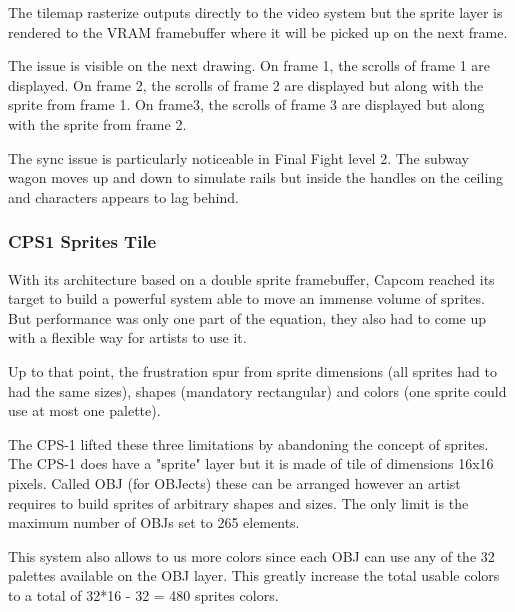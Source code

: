 The tilemap rasterize outputs directly to the video system but the sprite layer is rendered to the VRAM framebuffer where it will be picked up on the next frame.
 


The issue is visible on the next drawing. On frame 1, the scrolls of frame 1 are displayed. On frame 2, the scrolls of frame 2 are displayed but along with the sprite from frame 1. On frame3, the scrolls of frame 3 are displayed but along with the sprite from frame 2. 


\begin{trivia}
The sync issue is particularly noticeable in Final Fight level 2. The subway wagon moves up and down to simulate rails but inside the handles on the ceiling and characters appears to lag behind.
\end{trivia}

\subsubsection{CPS1 Sprites Tile}
With its architecture based on a double sprite framebuffer, Capcom reached its target to build a powerful system able to move an immense volume of sprites. But performance was only one part of the equation, they also had to come up with a flexible way for artists to use it.

Up to that point, the frustration spur from sprite dimensions (all sprites had to had the same sizes), shapes (mandatory rectangular) and colors (one sprite could use at most one palette). 

The CPS-1 lifted these three limitations by abandoning the concept of sprites. The CPS-1 does have a "sprite" layer but it is made of tile of dimensions 16x16 pixels. Called OBJ (for OBJects) these can be arranged however an artist requires to build sprites of arbitrary shapes and sizes. The only limit is the maximum number of OBJs set to 265 elements. 

This system also allows to us more colors since each OBJ can use any of the 32 palettes available on the OBJ layer. This greatly increase the total usable colors to a total of 32*16 - 32 = 480 sprites colors. 




\begin{minipage}[t]{0.49\linewidth}
\end{minipage}%
\hfill%
\begin{minipage}[t]{0.49\linewidth}
\end{minipage}


